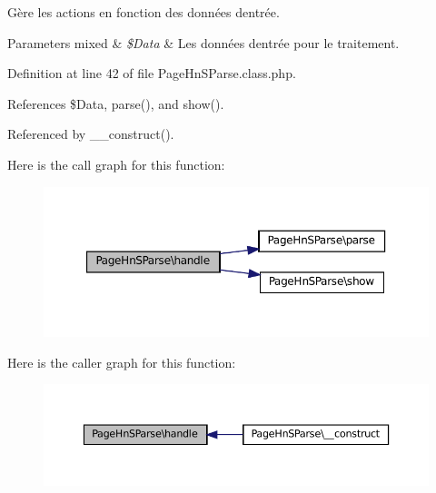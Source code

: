Gère les actions en fonction des données d\textquotesingle{}entrée.


\begin{DoxyParams}[1]{Parameters}
mixed & {\em \$\+Data} & Les données d\textquotesingle{}entrée pour le traitement. \\
\hline
\end{DoxyParams}


Definition at line 42 of file Page\+Hn\+S\+Parse.\+class.\+php.



References \$\+Data, parse(), and show().



Referenced by \+\_\+\+\_\+construct().

Here is the call graph for this function\+:\nopagebreak
\begin{figure}[H]
\begin{center}
\leavevmode
\includegraphics[width=350pt]{class_page_hn_s_parse_a4237724d654a67c55fa822c06b6ab7e4_cgraph}
\end{center}
\end{figure}
Here is the caller graph for this function\+:\nopagebreak
\begin{figure}[H]
\begin{center}
\leavevmode
\includegraphics[width=350pt]{class_page_hn_s_parse_a4237724d654a67c55fa822c06b6ab7e4_icgraph}
\end{center}
\end{figure}
\mbox{\label{class_page_hn_s_parse_ac1c8575cca2948593c34fe434340e62c}} 
